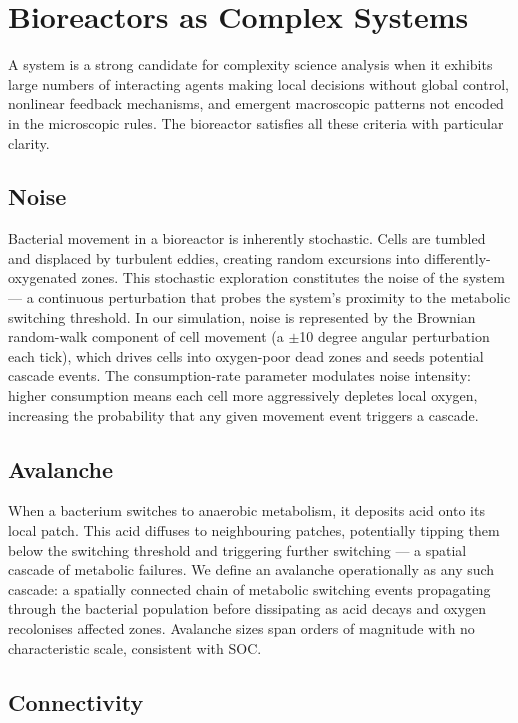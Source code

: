 \documentclass[12pt]{article}
\begin{document}
\section{Bioreactors as Complex Systems}

A system is a strong candidate for complexity science analysis when it exhibits large numbers of interacting agents making local decisions without global control, nonlinear feedback mechanisms, and emergent macroscopic patterns not encoded in the microscopic rules. The bioreactor satisfies all these criteria with particular clarity.

\subsection{Noise}

Bacterial movement in a bioreactor is inherently stochastic. Cells are tumbled and displaced by turbulent eddies, creating random excursions into differently-oxygenated zones. This stochastic exploration constitutes the noise of the system --- a continuous perturbation that probes the system's proximity to the metabolic switching threshold. In our simulation, noise is represented by the Brownian random-walk component of cell movement (a $\pm$10 degree angular perturbation each tick), which drives cells into oxygen-poor dead zones and seeds potential cascade events. The consumption-rate parameter modulates noise intensity: higher consumption means each cell more aggressively depletes local oxygen, increasing the probability that any given movement event triggers a cascade.

\subsection{Avalanche}

When a bacterium switches to anaerobic metabolism, it deposits acid onto its local patch. This acid diffuses to neighbouring patches, potentially tipping them below the switching threshold and triggering further switching --- a spatial cascade of metabolic failures. We define an avalanche operationally as any such cascade: a spatially connected chain of metabolic switching events propagating through the bacterial population before dissipating as acid decays and oxygen recolonises affected zones. Avalanche sizes span orders of magnitude with no characteristic scale, consistent with SOC.

\subsection{Connectivity}
\end{document}
